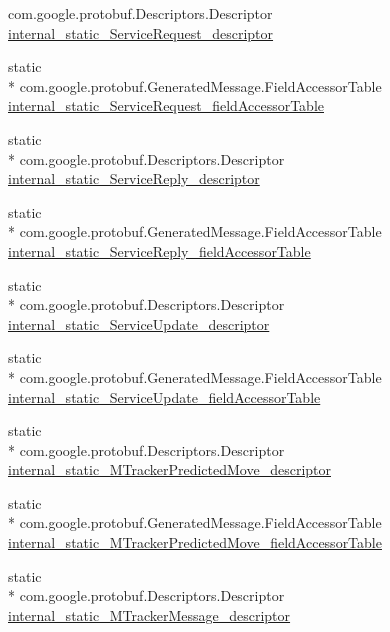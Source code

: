 \begin{DoxyCompactItemize}
com.\+google.\+protobuf.\+Descriptors.\+Descriptor \hyperlink{classeu_1_1uloop_1_1messages_1_1UloopMessages_a059c423d6c15676f8b44e8d9325a9f70}{internal\+\_\+static\+\_\+\+Service\+Request\+\_\+descriptor}
\item 
static \\*
com.\+google.\+protobuf.\+Generated\+Message.\+Field\+Accessor\+Table \hyperlink{classeu_1_1uloop_1_1messages_1_1UloopMessages_a4cf92dd9b6666ccc757b25a4715fc139}{internal\+\_\+static\+\_\+\+Service\+Request\+\_\+field\+Accessor\+Table}
\item 
static \\*
com.\+google.\+protobuf.\+Descriptors.\+Descriptor \hyperlink{classeu_1_1uloop_1_1messages_1_1UloopMessages_a6f7c2ff86a5562aefdb693f28f9599d8}{internal\+\_\+static\+\_\+\+Service\+Reply\+\_\+descriptor}
\item 
static \\*
com.\+google.\+protobuf.\+Generated\+Message.\+Field\+Accessor\+Table \hyperlink{classeu_1_1uloop_1_1messages_1_1UloopMessages_a5877368b1e1fbe2f8f127789c85786b7}{internal\+\_\+static\+\_\+\+Service\+Reply\+\_\+field\+Accessor\+Table}
\item 
static \\*
com.\+google.\+protobuf.\+Descriptors.\+Descriptor \hyperlink{classeu_1_1uloop_1_1messages_1_1UloopMessages_a089623dfd6fb18d666d480858aeb31f9}{internal\+\_\+static\+\_\+\+Service\+Update\+\_\+descriptor}
\item 
static \\*
com.\+google.\+protobuf.\+Generated\+Message.\+Field\+Accessor\+Table \hyperlink{classeu_1_1uloop_1_1messages_1_1UloopMessages_a2d99a386e4eed12f8c841d85687ba392}{internal\+\_\+static\+\_\+\+Service\+Update\+\_\+field\+Accessor\+Table}
\item 
static \\*
com.\+google.\+protobuf.\+Descriptors.\+Descriptor \hyperlink{classeu_1_1uloop_1_1messages_1_1UloopMessages_a76ed45449af8022294150fafbb8ae52f}{internal\+\_\+static\+\_\+\+M\+Tracker\+Predicted\+Move\+\_\+descriptor}
\item 
static \\*
com.\+google.\+protobuf.\+Generated\+Message.\+Field\+Accessor\+Table \hyperlink{classeu_1_1uloop_1_1messages_1_1UloopMessages_a34b19abab07a6d39fe629c7673cf27d2}{internal\+\_\+static\+\_\+\+M\+Tracker\+Predicted\+Move\+\_\+field\+Accessor\+Table}
\item 
static \\*
com.\+google.\+protobuf.\+Descriptors.\+Descriptor \hyperlink{classeu_1_1uloop_1_1messages_1_1UloopMessages_a63af724585d58cde5017afa1ec20e247}{internal\+\_\+static\+\_\+\+M\+Tracker\+Message\+\_\+descriptor}

\end{DoxyCompactItemize}
